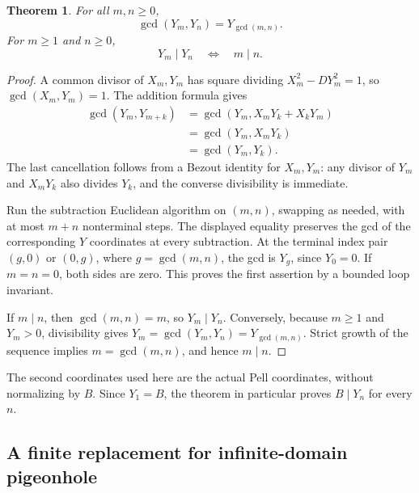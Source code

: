 \documentclass[11pt,letterpaper]{article}
\newtheorem{theorem}{Theorem}[section]
\theoremstyle{definition}
\begin{document}
\begin{theorem}\label{thm:gcd}
For all $m,n\ge0$,
\[
 \gcd(Y_m,Y_n)=Y_{\gcd(m,n)}.
\]
For $m\ge1$ and $n\ge0$,
\[
 Y_m\mid Y_n\quad\Longleftrightarrow\quad m\mid n.
\]
\end{theorem}
\begin{proof}
A common divisor of $X_m,Y_m$ has square dividing
$X_m^2-DY_m^2=1$, so $\gcd(X_m,Y_m)=1$. The addition formula gives
\[
\begin{aligned}
 \gcd(Y_m,Y_{m+k})
 &=\gcd(Y_m,X_mY_k+X_kY_m)\\
 &=\gcd(Y_m,X_mY_k)\\
 &=\gcd(Y_m,Y_k).
\end{aligned}
\]
The last cancellation follows from a Bezout identity for $X_m,Y_m$:
any divisor of $Y_m$ and $X_mY_k$ also divides $Y_k$, and the converse
divisibility is immediate.

Run the subtraction Euclidean algorithm on $(m,n)$, swapping as needed,
with at most $m+n$ nonterminal steps. The displayed equality preserves
the gcd of the corresponding $Y$ coordinates at every subtraction.
At the terminal index pair $(g,0)$ or $(0,g)$, where $g=\gcd(m,n)$,
the gcd is $Y_g$, since $Y_0=0$. If $m=n=0$, both sides are zero.
This proves the first assertion by a bounded loop invariant.

If $m\mid n$, then $\gcd(m,n)=m$, so $Y_m\mid Y_n$.
Conversely, because $m\ge1$ and $Y_m>0$, divisibility gives
$Y_m=\gcd(Y_m,Y_n)=Y_{\gcd(m,n)}$. Strict growth of the sequence implies
$m=\gcd(m,n)$, and hence $m\mid n$.
\end{proof}

The second coordinates used here are the actual Pell coordinates, without
normalizing by $B$. Since $Y_1=B$, the theorem in particular proves
$B\mid Y_n$ for every $n$.

\subsection{A finite replacement for infinite-domain pigeonhole}
\end{document}
